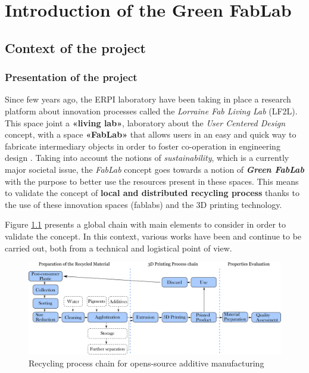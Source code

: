 \part{Introduction of the Green FabLab}

\chapter{Context of the project}

\section{Presentation of the project}

Since few years ago, the ERPI laboratory have been taking in place a research platform about innovation processes called the \textit{Lorraine Fab Living Lab} (LF2L).
This space joint a \textbf{«living lab»}, laboratory about the \textit{User Centered Design} concept, with a space \textbf{«FabLab»} that allows users in an easy and quick way to fabricate intermediary  objects in order to foster co-operation in engineering design \parencite{Boujut2003}.
Taking into account the notions of \textit{sustainability}, which is a currently  major societal issue, the \textit{FabLab} concept goes towards a notion of \textit{\textbf{Green FabLab}} with the purpose to better use  the resources present in these spaces.
This means to validate the concept of \textbf{local and distributed recycling process} thanks to the use of these innovation spaces (fablabs) and the 3D printing technology.

Figure \ref{Context} presents a global chain with main elements to consider in order to validate the concept.
In this context, various works have been and continue to be carried out, both from a technical  and logistical point of view.


\begin{figure}[H]
	\centering
	\includegraphics[width=\textwidth]{Figures/Mechanical-Recycling.pdf}
	\caption{Recycling process chain for opens-source additive manufacturing}
	\label{Context}
\end{figure}


